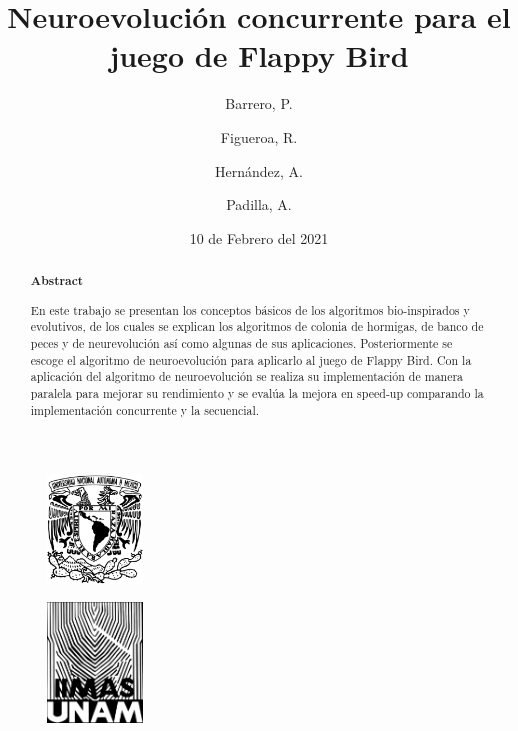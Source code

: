 \documentclass[twocolumn,spanish]{revtex4-1}
\begin{document}
\title{Neuroevolución concurrente para el juego de Flappy Bird}
\author{Barrero, P.}
\author{Figueroa, R.}
\author{Hernández, A.}
\author{Padilla, A.}
\date{10 de Febrero del 2021}

\begin{figure}
    \flushleft \includegraphics[width=1in]{unam_logo.jpg}
\end{figure}
\begin{figure}
    \flushright \includegraphics[width=1in]{logoiimas.png}
\end{figure}
\begin{abstract}   %
\begin{center}
\textbf{Abstract} \\
\end{center}

En este trabajo se presentan los conceptos básicos de los algoritmos bio-inspirados y evolutivos, de los cuales se explican los algoritmos de colonia de hormigas, de banco de peces y de neurevolución así como algunas de sus aplicaciones. Posteriormente se escoge el algoritmo de neuroevolución para aplicarlo al juego de Flappy Bird. Con la aplicación del algoritmo de neuroevolución se realiza su implementación de manera paralela para mejorar su rendimiento y se evalúa la mejora en speed-up comparando la implementación concurrente y la secuencial.

\end{abstract}

\maketitle


\end{document}
